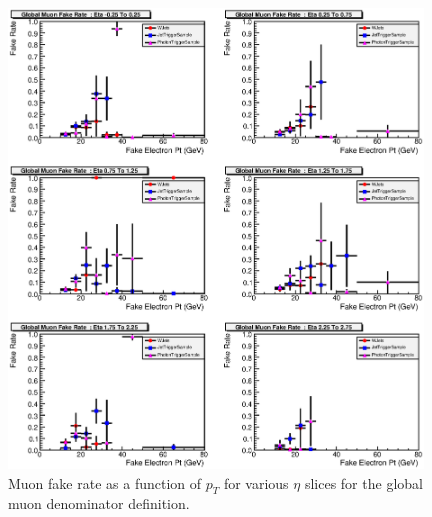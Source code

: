 \documentclass{cmspaper}
\begin{document}
\begin{figure}[htb]
\begin{center}
\includegraphics[width=0.98\textwidth]{plots/GlobalMuonFakeRateEtaSlices.eps}
   \caption{Muon fake rate as a function of $p_T$ for various $\eta$ slices for the global muon denominator definition. }
   \label{fig:muonFR_global_etaslices}
\end{center}
\end{figure}
\end{document}
